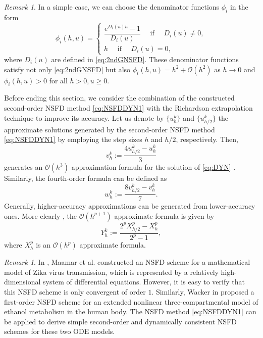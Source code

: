 \documentclass[12pt]{article}
\theoremstyle{definition}
\theoremstyle{remark}
\newtheorem{remark}[theorem]{Remark}
\numberwithin{equation}{section}
\begin{document}
\begin{remark}
In a simple case, we can choose the denominator functions $\phi_i$ in the form
\begin{equation}\label{eq:18}
\phi_i(h, u)=\left\{\begin{array}{l}
\dfrac{e^{D_i(u)h} - 1}{D_i(u)} \quad \text { if } \quad D_i(u) \neq 0,\\
h \quad \text { if } \quad D_i(u)=0,
\end{array}\right.
\end{equation}
where $D_i(u)$ are defined in \eqref{eq:2ndGNSFD}. These denominator functions satisfy not only \eqref{eq:2ndGNSFD} but also $\phi_i(h, u) = h^2+ \mathcal{O}\left(h^2\right)$ as $h \rightarrow 0$ and $\phi_i(h, u) > 0$ for all $h >0, u \geq 0$.
\end{remark}
Before ending this section, we consider the combination of the constructed second-order NSFD method \eqref{eq:NSFDDYN1} with the Richardson extrapolation technique \cite{Burden, Richardson, Roy} to improve its accuracy. Let us denote by $\{u_{h}^k\}$ and $\{u_{h/2}^k\}$ the approximate solutions generated by the second-order NSFD method \eqref{eq:NSFDDYN1} by employing the step sizes $h$ and $h/2$, respectively. Then,
\begin{equation}\label{eq:3rdENSFD}
v_{h}^k := \dfrac{4u_{h/2}^k  - u_{h}^k}{3}
\end{equation}
generates an $\mathcal{O}(h^3)$ approximation formula for the solution of \eqref{eq:DYN} \cite{Burden}. Similarly, the fourth-order formula can be defined as  \cite{Burden}
\begin{equation}\label{eq:4thENSFD}
w^k_{h}:=\dfrac{8 v^k_{h/2}- v^k_{h}}{7}.
\end{equation}
Generally, higher-accuracy approximations can be generated from lower-accuracy ones. More clearly , the $\mathcal{O}(h^{p+1})$ approximate formula is given by  \cite{Burden}
\begin{equation*}
Y_{h}^k := \dfrac{2^p X^p_{h/2} - X^p_{h}}{2^p-1},
\end{equation*}
where $X^p_{h}$ is an $\mathcal{O}(h^p)$ approximate formula.
\begin{remark}\label{Remark1new}
In \cite{Maamar}, Maamar et al. constructed an NSFD scheme for a mathematical model of Zika virus transmission, which is represented by a relatively high-dimensional system of differential equations. However, it is easy to verify that this NSFD scheme is only convergent of order $1$. Similarly, Wacker in \cite{Wacker} proposed a first-order NSFD scheme for  an extended nonlinear three-compartmental model of ethanol metabolism in the human body. The NSFD method \eqref{eq:NSFDDYN1} can be applied to derive simple second-order and dynamically consistent NSFD schemes for these two ODE models.
\end{remark}
%
%
%
%
%
%
%
%
%
\end{document}
